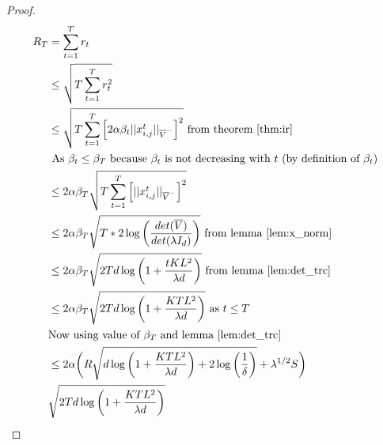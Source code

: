 \begin{proof}
	\begin{align*}
	R_T &= \sum_{t=1}^T r_t \\
	&\le \sqrt{T\sum_{t=1}^T r_t^2} \\
	&\le \sqrt{T\sum_{t=1}^T \left[2\alpha \beta_t||x_{i,j}^t||_{\overline{V}^-}\right]^2} \text{ from theorem~\ref{thm:ir}} \\
	& \text{ As $\beta_t \le \beta_T$ because $\beta_t$ is not decreasing with $t$ (by definition of $\beta_t$)} \\
	&\le 2\alpha \beta_T \sqrt{T\sum_{t=1}^T \left[||x_{i,j}^t||_{\overline{V}^-}\right]^2}  \\
	&\le 2\alpha \beta_T \sqrt{T * 2\log\bigg(\frac{det(\overline{V})}{det(\lambda I_d)}\bigg)} \text{ from lemma~\ref{lem:x_norm}} \\
	&\le 2\alpha \beta_T \sqrt{2Td\log\bigg(1 + \frac{tKL^2}{\lambda d}\bigg)}  \text{ from lemma~\ref{lem:det_trc}} \\
	&\le 2\alpha \beta_T \sqrt{2Td\log\bigg(1 + \frac{KTL^2}{\lambda d}\bigg)}   \text{ as } t \le T \\
	& \text{Now using value of $\beta_T$ and lemma~\ref{lem:det_trc}} \\
	&\le 2\alpha \bigg( R\sqrt{d\log\bigg(1 + \frac{KTL^2}{\lambda d}\bigg) + 2\log\bigg(\frac{1}{\delta}\bigg)} + \lambda^{1/2}S\bigg) \\
	& \sqrt{2Td\log\bigg(1 + \frac{KTL^2}{\lambda d}\bigg)}
	\end{align*}
\end{proof}
\vspace{-0.8cm}
